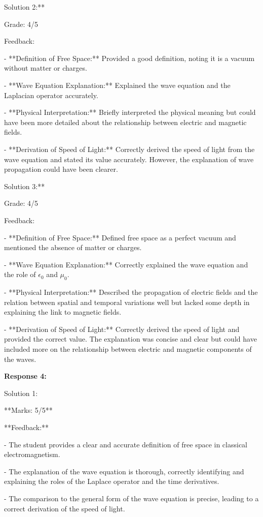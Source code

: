 \documentclass[a4paper,11pt]{article}
\begin{document}
Solution 2:**

Grade: 4/5

Feedback:

- **Definition of Free Space:** Provided a good definition, noting it is a vacuum without matter or charges.

- **Wave Equation Explanation:** Explained the wave equation and the Laplacian operator accurately.

- **Physical Interpretation:** Briefly interpreted the physical meaning but could have been more detailed about the relationship between electric and magnetic fields.

- **Derivation of Speed of Light:** Correctly derived the speed of light from the wave equation and stated its value accurately. However, the explanation of wave propagation could have been clearer.

Solution 3:**

Grade: 4/5

Feedback:

- **Definition of Free Space:** Defined free space as a perfect vacuum and mentioned the absence of matter or charges.

- **Wave Equation Explanation:** Correctly explained the wave equation and the role of \(\epsilon_0\) and \(\mu_0\).

- **Physical Interpretation:** Described the propagation of electric fields and the relation between spatial and temporal variations well but lacked some depth in explaining the link to magnetic fields.

- **Derivation of Speed of Light:** Correctly derived the speed of light and provided the correct value. The explanation was concise and clear but could have included more on the relationship between electric and magnetic components of the waves.

\bigskip
\textbf{Response 4:}

Solution 1: 

**Marks: 5/5**

**Feedback:**

- The student provides a clear and accurate definition of free space in classical electromagnetism.

- The explanation of the wave equation is thorough, correctly identifying and explaining the roles of the Laplace operator and the time derivatives.

- The comparison to the general form of the wave equation is precise, leading to a correct derivation of the speed of light.
\end{document}
